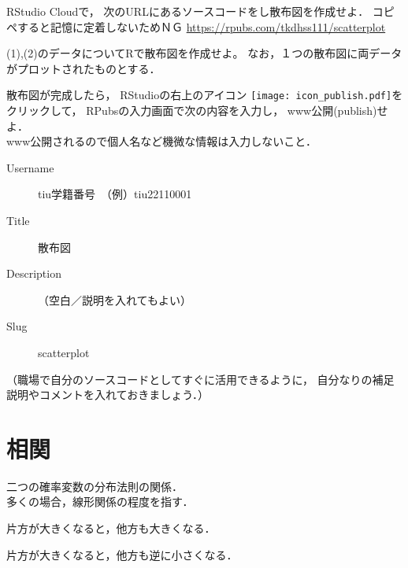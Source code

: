{
  \MySolution
  {
  }
}

{
  RStudio Cloudで，
  次のURLにあるソースコードをし散布図を作成せよ．
  \alert{コピペすると記憶に定着しないためＮＧ}
  \url{https://rpubs.com/tkdhss111/scatterplot}
}

{

}

{
  (1),(2)のデータについてRで散布図を作成せよ。
  なお，１つの散布図に両データがプロットされたものとする．
}

{
  散布図が完成したら，
  RStudioの右上のアイコン
  \texttt{[image: icon\_publish.pdf]}をクリックして，
  RPubsの入力画面で次の内容を入力し，
  www公開(publish)せよ．\\
  \alert{www公開されるので個人名など機微な情報は入力しないこと．}
  \begin{description}
    \item[Username] tiu学籍番号　（例）tiu22110001\\
    \item[Title] 散布図\\
    \item[Description] （空白／説明を入れてもよい）\\
    \item[Slug] scatterplot
  \end{description}
  （職場で自分のソースコードとしてすぐに活用できるように，
    自分なりの補足説明やコメントを入れておきましょう．）
}

\section{相関}

\MyFrame{\insertsection}
{
  {
    二つの確率変数の分布法則の関係．\\
    多くの場合，線形関係の程度を指す．
  }
}

\MyFrame{\insertsection}
{
}
\note
{
  片方が大きくなると，他方も大きくなる．
}

\MyFrame{\insertsection}
{
}
\note
{
  片方が大きくなると，他方も逆に小さくなる．
}

